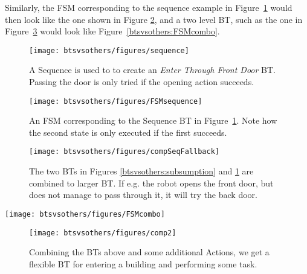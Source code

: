 Similarly, the FSM corresponding to the sequence example in Figure~\ref{btsvsothers:recipe} would then look like the one shown in Figure \ref{btsvsothers:FSMsequence}, and a two level BT, such as the one in  Figure~\ref{btsvsothers:comb1} would look like Figure~\ref{btsvsothers:FSMcombo}.



\begin{figure}[h]
\begin{center}
\texttt{[image: btsvsothers/figures/sequence]}
\caption{
A Sequence is used to to create an \emph{Enter Through Front Door} BT.
Passing the door  is only tried if the opening action succeeds.}
\label{btsvsothers:recipe}
\end{center}
\end{figure}



 \begin{figure}[h]
\begin{center}
\centering
\texttt{[image: btsvsothers/figures/FSMsequence]}
\caption{An FSM corresponding to the Sequence BT in Figure~\ref{btsvsothers:recipe}.  
Note how the second state is only executed if the first succeeds.
}
\label{btsvsothers:FSMsequence}
\end{center}
\end{figure}


\begin{figure}[htbp]
\begin{center}
\texttt{[image: btsvsothers/figures/compSeqFallback]}
\caption{The two BTs in Figures \ref{btsvsothers:subsumption}
 and \ref{btsvsothers:recipe} are combined to larger BT. If e.g. the robot opens the front door, but does not manage to pass through it, it will try the back door.}
\label{btsvsothers:comb1}
\end{center}
\end{figure}



 \begin{figure*}[htbp]
\begin{center}
\texttt{[image: btsvsothers/figures/FSMcombo]}
\caption{An FSM corresponding to the BT in Figure~\ref{btsvsothers:comb1}. 
 }
\label{btsvsothers:FSMcombo}
\end{center}
\end{figure*}


\begin{figure}[htbp]
\begin{center}
\texttt{[image: btsvsothers/figures/comp2]}
\caption{Combining the BTs above and some additional Actions, we get a flexible BT for entering a building and performing some task.}
\label{btsvsothers:comb2}
\end{center}
\end{figure}


